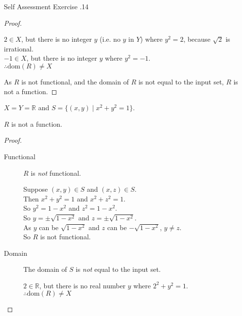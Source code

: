 \documentclass[\main/notes.tex]{subfiles}
\begin{document}
\begin{exercise}{Self Assessment Exercise \thechapter.14}
\begin{questions}
\begin{questions}
\begin{answer}
\begin{proof}
\begin{description}
													\begin{subproof}[Counterexample]
														$2 \in X$, but there is no integer $y$ (i.e. no $y$ in $Y$) where $y^{2} = 2$, because $\sqrt{2}$ is irrational.\\
														$-1 \in X$, but there is no integer $y$ where $y^{2} = -1$.\\
														$\therefore \mathrm{dom}(R) \neq X$ 
													\end{subproof}
											\end{description}
											As $R$ is not functional, and the domain of $R$ is not equal to the input set, $R$ is not a function.
										\end{proof}
									\end{answer}
								\pagebreak
								\item $X = Y = \mathbb{R}$ and $S = \bigl\{(x, y) \mid x^{2} + y^{2} = 1\bigr\}$.\\
									\begin{answer}
										$R$ is not a function.
										\begin{proof}
											$ $
											\begin{description}
												\item[Functional] $R$ is \emph{not} functional.
													\begin{subproof}[Subproof]
														Suppose $(x, y) \in S$ and $(x, z) \in S$.\\
														Then $x^{2} + y^{2} = 1$ and $x^{2} + z^{2} = 1$.\\
														So $y^{2} = 1 - x^{2}$ and $z^{2} = 1 - x^{2}$.\\
														So $y = \pm \sqrt{1 - x^{2}}$ and $z = \pm \sqrt{1 - x^{2}}$.\\
														As $y$ can be $\sqrt{1 - x^{2}}$ and $z$ can be $- \sqrt{1 - x^{2}}$, $y \neq z$.\\
														So $R$ is not functional.
													\end{subproof}
												\item[Domain] The domain of $S$ is \emph{not} equal to the input set.
													\begin{subproof}[Counterexample]
														$2 \in \mathbb{R}$, but there is no real number $y$ where $2^{2} + y^{2} = 1$.\\
														$\therefore \mathrm{dom}(R) \neq X$
													\end{subproof}
											\end{description}

\end{proof}
\end{answer}
\end{questions}
\end{questions}
\end{exercise}
\end{document}
